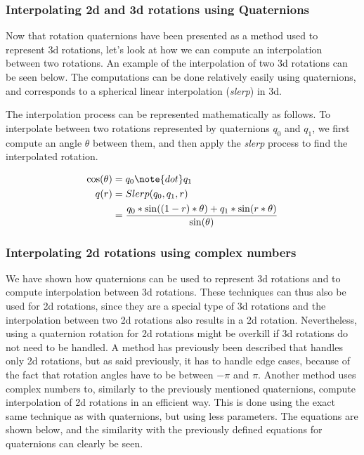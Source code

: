 		\subsubsection{Interpolating 2d and 3d rotations using Quaternions}
		
		Now that rotation quaternions have been presented as a method used to represent 3d rotations, let's look at how we can compute an interpolation between two rotations. An example of the interpolation of two 3d rotations can be seen below.  The computations can be done relatively easily using quaternions, and corresponds to a spherical linear interpolation (\textit{slerp}) in 3d.
		
		The interpolation process can be represented mathematically as follows. To interpolate between two rotations represented by quaternions \( q_0 \) and \( q_1 \), we first compute an angle \( \theta \) between them, and then apply the \textit{slerp} process to find the interpolated rotation.
		
		\begin{equation}
		\begin{split}
			\cos(\theta) 	& = q_0 \note{dot} q_1 \\
			q(r) 			& = Slerp(q_0, q_1, r) \\
							& = \frac{q_0 * \sin((1-r)*\theta) + q_1 * \sin(r*\theta)}{\sin(\theta)}
		\end{split}
		\end{equation}
			
		\subsubsection{Interpolating 2d rotations using complex numbers}
		
		We have shown how quaternions can be used to represent 3d rotations and to compute interpolation between 3d rotations. These techniques can thus also be used for 2d rotations, since they are a special type of 3d rotations and the interpolation between two 2d rotations also results in a 2d rotation.
		Nevertheless, using a quaternion rotation for 2d rotations might be overkill if 3d rotations do not need to be handled. A method has previously been described that handles only 2d rotations, but as said previously, it has to handle edge cases, because of the fact that rotation angles have to be between \( - \pi \) and \( \pi \). Another method uses complex numbers to, similarly to the previously mentioned quaternions, compute interpolation of 2d rotations in an efficient way. This is done using the exact same technique as with quaternions, but using less parameters. The equations are shown below, and the similarity with the previously defined equations for quaternions can clearly be seen.
		

